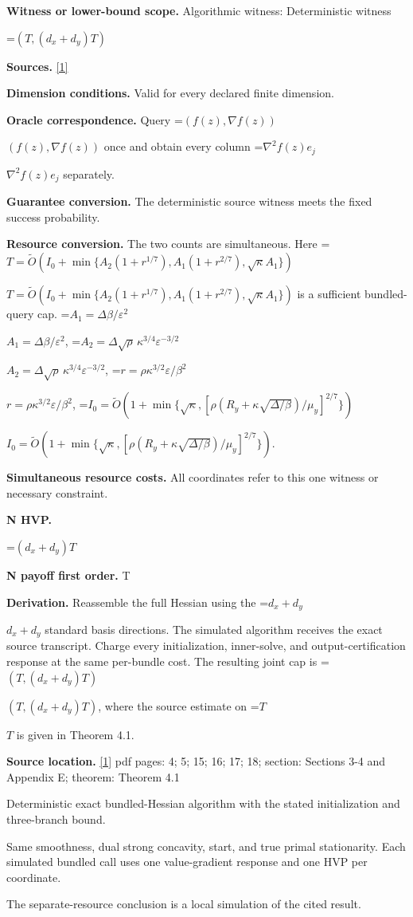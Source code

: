 \documentclass[10pt,a4paper]{article}
\newcommand{\AtlasMath}[1]{\par\begingroup\centering\setbox0=\hbox{$\displaystyle #1$}\ifdim\wd0>1.4\linewidth\typeout{ATLAS WIDE FORMULA: \the\wd0}\fi\ifdim\wd0>\linewidth\resizebox{\linewidth}{!}{\box0}\else\box0\fi\par\endgroup}
\newcommand{\AtlasInlineMath}[1]{\begingroup\setbox0=\hbox{$#1$}\ifdim\wd0>.4\linewidth\endgroup\AtlasMath{#1}\else\endgroup$#1$\fi}
\begin{document}
\textbf{Witness or lower-bound scope.} Algorithmic witness: Deterministic witness

\AtlasMath{(T,(d_x+d_y)T)}
\textbf{Sources.} \href{https://arxiv.org/pdf/2610.16771v2}{[1]}

\textbf{Dimension conditions.} Valid for every declared finite dimension.

\textbf{Oracle correspondence.} Query \AtlasInlineMath{(f(z),\nabla f(z))} once and obtain every column \AtlasInlineMath{\nabla^2f(z)e_j} separately.

\textbf{Guarantee conversion.} The deterministic source witness meets the fixed success probability.

\textbf{Resource conversion.} The two counts are simultaneous. Here \AtlasInlineMath{T=\widetilde O\!\left(I_0+\min\{A_2(1+r^{1/7}),A_1(1+r^{2/7}),\sqrt\kappa A_1\}\right)} is a sufficient bundled-query cap. \AtlasInlineMath{A_1=\Delta\beta/\varepsilon^2}, \AtlasInlineMath{A_2=\Delta\sqrt{\rho}\,\kappa^{3/4}\varepsilon^{-3/2}}, \AtlasInlineMath{r=\rho\kappa^{3/2}\varepsilon/\beta^2}, \AtlasInlineMath{I_0=\widetilde O\!\left(1+\min\{\sqrt{\kappa},[\rho(R_y+\kappa\sqrt{\Delta/\beta})/\mu_y]^{2/7}\}\right)}.

\textbf{Simultaneous resource costs.} All coordinates refer to this one witness or necessary constraint.

\textbf{N HVP.}

\AtlasMath{(d_x+d_y)T}
\textbf{N payoff first order.} T

\textbf{Derivation.} Reassemble the full Hessian using the \AtlasInlineMath{d_x+d_y} standard basis directions. The simulated algorithm receives the exact source transcript. Charge every initialization, inner-solve, and output-certification response at the same per-bundle cost. The resulting joint cap is \AtlasInlineMath{(T,(d_x+d_y)T)}, where the source estimate on \AtlasInlineMath{T} is given in Theorem 4.1.

\textbf{Source location.} \href{https://arxiv.org/pdf/2610.16771v2}{[1]} pdf pages: 4; 5; 15; 16; 17; 18; section: Sections 3-4 and Appendix E; theorem: Theorem 4.1

Deterministic exact bundled-Hessian algorithm with the stated initialization and three-branch bound.

Same smoothness, dual strong concavity, start, and true primal stationarity. Each simulated bundled call uses one value-gradient response and one HVP per coordinate.

The separate-resource conclusion is a local simulation of the cited result.
\end{document}
